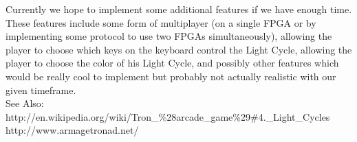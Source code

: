 \documentclass[12pt,letterpaper] {article}
\begin{document}
\indent Currently we hope to implement some additional features if we have enough time. These features include some form of multiplayer (on a single FPGA or by implementing some protocol to use two FPGAs simultaneously), allowing the player to choose which keys on the keyboard control the Light Cycle, allowing the player to choose the color of his Light Cycle, and possibly other features which would be really cool to implement but probably not actually realistic with our given timeframe.\\
\newline
\noindent See Also:\\
\indent http://en.wikipedia.org/wiki/Tron\_\%28arcade\_game\%29\#4.\_Light\_Cycles\\
\indent http://www.armagetronad.net/\\
\end{document}
